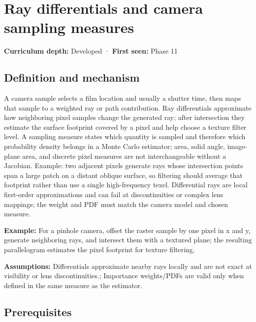 \hypertarget{appendix-8c40fad29462}{}\label{referencestart:appendix-8c40fad29462}
\section{Ray differentials and camera sampling measures}\label{appendix-8c40fad29462-ray-differentials-and-camera-sampling-measures}

\textbf{Curriculum depth:} Developed · \textbf{First seen:} Phase 11

\subsection{Definition and mechanism}\label{appendix-8c40fad29462-definition-and-mechanism}

A camera sample selects a film location and usually a shutter time, then maps that sample to a weighted ray or path contribution. Ray differentials approximate how neighboring pixel samples change the generated ray; after intersection they estimate the surface footprint covered by a pixel and help choose a texture filter level. A sampling measure states which quantity is sampled and therefore which probability density belongs in a Monte Carlo estimator; area, solid angle, image-plane area, and discrete pixel measures are not interchangeable without a Jacobian. Example: two adjacent pixels generate rays whose intersection points span a large patch on a distant oblique surface, so filtering should average that footprint rather than use a single high-frequency texel. Differential rays are local first-order approximations and can fail at discontinuities or complex lens mappings; the weight and PDF must match the camera model and chosen measure.

\textbf{Example:} For a pinhole camera, offset the raster sample by one pixel in x and y, generate neighboring rays, and intersect them with a textured plane; the resulting parallelogram estimates the pixel footprint for texture filtering.

\textbf{Assumptions:} Differentials approximate nearby rays locally and are not exact at visibility or lens discontinuities.; Importance weights/PDFs are valid only when defined in the same measure as the estimator.

\subsection{Prerequisites}\label{appendix-8c40fad29462-prerequisites}

